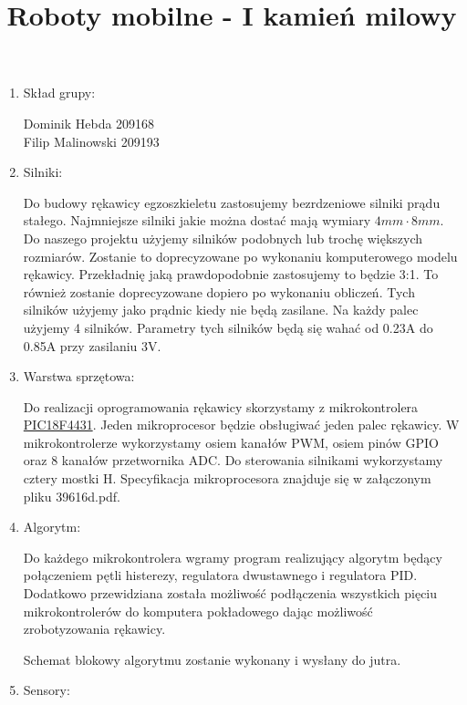 \documentclass[a4paper]{article}
\author{}
\title{Roboty mobilne - I kamień milowy}
\date{}
\begin{document}
\maketitle

\begin{enumerate}

\item Skład grupy:

Dominik Hebda 209168 \\
Filip Malinowski 209193

\item Silniki:

Do budowy rękawicy egzoszkieletu zastosujemy bezrdzeniowe silniki prądu stałego. Najmniejsze silniki jakie można dostać mają wymiary
\begin{math}
4mm \cdot 8mm.
\end{math}
Do naszego projektu użyjemy silników podobnych lub trochę większych rozmiarów. Zostanie to doprecyzowane po wykonaniu komputerowego modelu rękawicy. Przekładnię jaką prawdopodobnie zastosujemy to będzie 3:1. To również zostanie doprecyzowane dopiero po wykonaniu obliczeń. Tych silników użyjemy jako prądnic kiedy nie będą zasilane. Na każdy palec użyjemy 4 silników. Parametry tych silników będą się wahać od 0.23A do 0.85A przy zasilaniu 3V.

\item Warstwa sprzętowa:

Do realizacji oprogramowania rękawicy skorzystamy z mikrokontrolera
\href{http://www.microchip.com/wwwproducts/en/PIC18F4431}{PIC18F4431}.
Jeden mikroprocesor będzie obsługiwać jeden palec rękawicy. W mikrokontrolerze wykorzystamy osiem kanałów PWM, osiem pinów GPIO oraz 8 kanałów przetwornika ADC. Do sterowania silnikami wykorzystamy cztery mostki H. Specyfikacja mikroprocesora znajduje się w załączonym pliku 39616d.pdf.


\item Algorytm:

Do każdego mikrokontrolera wgramy program realizujący algorytm będący połączeniem pętli histerezy, regulatora dwustawnego i regulatora PID. Dodatkowo przewidziana została możliwość podłączenia wszystkich pięciu mikrokontrolerów do komputera pokładowego dając możliwość zrobotyzowania rękawicy.

Schemat blokowy algorytmu zostanie wykonany i wysłany do jutra.

\newpage

\item Sensory:


\end{enumerate}
\end{document}

